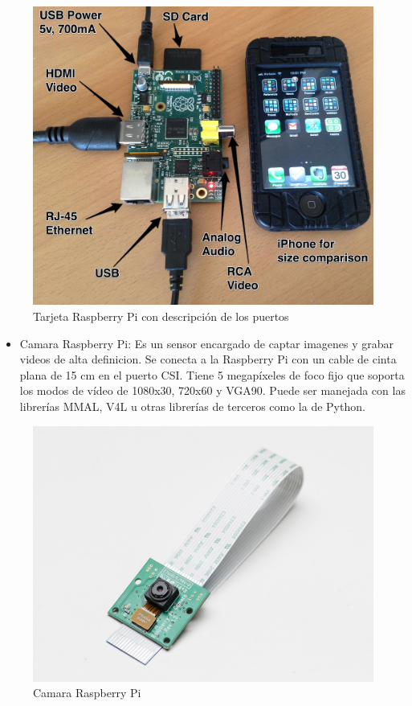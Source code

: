 \begin{figure}[hbtp]
\centering
\includegraphics[scale=0.1]{imagenes/raspberry_pi_iphone.jpg}
\caption{Tarjeta Raspberry Pi con descripción de los puertos}
\end{figure}

\begin{itemize}
\item Camara Raspberry Pi: Es un sensor encargado de captar imagenes y grabar videos de alta definicion. Se conecta a la
Raspberry Pi con un cable de cinta plana de 15 cm en el puerto CSI. Tiene 5 megapíxeles de foco fijo que soporta los modos
de vídeo de 1080x30, 720x60 y VGA90. Puede ser manejada con las librerías MMAL, V4L u otras librerías de terceros como la de
Python. \cite{raspberrycam} %

\end{itemize}

\begin{figure}[hbtp]
\centering
\includegraphics[scale=0.7]{imagenes/1367-01.jpg}
\caption{Camara Raspberry Pi}
\end{figure}


